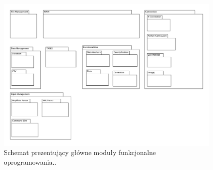 \begin{figure}[htp]
  \begin{center}
    \includegraphics[width=0.8\linewidth]{resources/img/Modules.png}
  \caption{Schemat prezentujący główne moduły funkcjonalne oprogramowania..} 
  \label{fig:modules}
  \end{center}
\end{figure}

